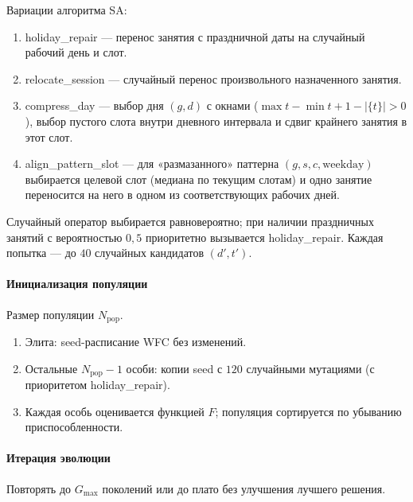 Вариации алгоритма SA:
\begin{enumerate}
	\item holiday\_repair --- перенос занятия с праздничной даты
	на случайный рабочий день и слот.

	\item relocate\_session --- случайный перенос произвольного
	назначенного занятия.

	\item compress\_day --- выбор дня $(g,d)$ с окнами
	($\max t-\min t+1-|\{t\}|>0$), выбор пустого слота внутри
	дневного интервала и сдвиг крайнего занятия в этот слот.

	\item align\_pattern\_slot --- для «размазанного» паттерна
	$(g,s,c,\mathrm{weekday})$ выбирается целевой слот (медиана по
	текущим слотам) и одно занятие переносится на него в одном из
	соответствующих рабочих дней.
\end{enumerate}

Случайный оператор выбирается равновероятно; при наличии
праздничных занятий с вероятностью $0{,}5$ приоритетно вызывается
holiday\_repair. Каждая попытка --- до $40$ случайных
кандидатов $(d',t')$.

\paragraph{Инициализация популяции}

Размер популяции $N_{\mathrm{pop}}$.
\begin{enumerate}
	\item Элита: seed-расписание WFC без изменений.
	\item Остальные $N_{\mathrm{pop}}-1$ особи: копии seed с
	$120$ случайными мутациями (с приоритетом holiday\_repair).
	\item Каждая особь оценивается функцией $F$; популяция сортируется
	по убыванию приспособленности.
\end{enumerate}

\paragraph{Итерация эволюции}

Повторять до $G_{\max}$ поколений или до плато без улучшения лучшего решения.

